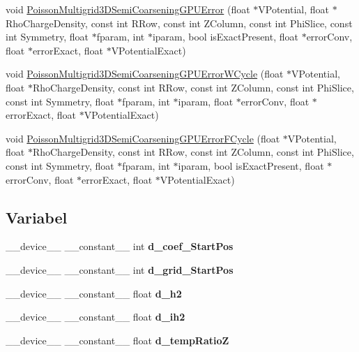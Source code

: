 \begin{DoxyCompactItemize}
\item 
void \hyperlink{PoissonSolver3DGPU_8cu_a06ab6e8b953038a4d4d4ea5e1ab646e8}{Poisson\+Multigrid3\+D\+Semi\+Coarsening\+G\+P\+U\+Error} (float $\ast$V\+Potential, float $\ast$Rho\+Charge\+Density, const int R\+Row, const int Z\+Column, const int Phi\+Slice, const int Symmetry, float $\ast$fparam, int $\ast$iparam, bool is\+Exact\+Present, float $\ast$error\+Conv, float $\ast$error\+Exact, float $\ast$V\+Potential\+Exact)
\item 
void \hyperlink{PoissonSolver3DGPU_8cu_a29ff8c657a945ecbeeb7b219169d09c6}{Poisson\+Multigrid3\+D\+Semi\+Coarsening\+G\+P\+U\+Error\+W\+Cycle} (float $\ast$V\+Potential, float $\ast$Rho\+Charge\+Density, const int R\+Row, const int Z\+Column, const int Phi\+Slice, const int Symmetry, float $\ast$fparam, int $\ast$iparam, float $\ast$error\+Conv, float $\ast$error\+Exact, float $\ast$V\+Potential\+Exact)
\item 
void \hyperlink{PoissonSolver3DGPU_8cu_a2a1da5844b8c399a35f446977c7ac550}{Poisson\+Multigrid3\+D\+Semi\+Coarsening\+G\+P\+U\+Error\+F\+Cycle} (float $\ast$V\+Potential, float $\ast$Rho\+Charge\+Density, const int R\+Row, const int Z\+Column, const int Phi\+Slice, const int Symmetry, float $\ast$fparam, int $\ast$iparam, bool is\+Exact\+Present, float $\ast$error\+Conv, float $\ast$error\+Exact, float $\ast$V\+Potential\+Exact)
\end{DoxyCompactItemize}
\subsection*{Variabel}
\begin{DoxyCompactItemize}
\item 
\hypertarget{PoissonSolver3DGPU_8cu_a1cbbf8dba207c28461994cbff905e3e1}{}\label{PoissonSolver3DGPU_8cu_a1cbbf8dba207c28461994cbff905e3e1} 
\+\_\+\+\_\+device\+\_\+\+\_\+ \+\_\+\+\_\+constant\+\_\+\+\_\+ int {\bfseries d\+\_\+coef\+\_\+\+Start\+Pos}
\item 
\hypertarget{PoissonSolver3DGPU_8cu_a779b816911e646fe3fa1319351101eeb}{}\label{PoissonSolver3DGPU_8cu_a779b816911e646fe3fa1319351101eeb} 
\+\_\+\+\_\+device\+\_\+\+\_\+ \+\_\+\+\_\+constant\+\_\+\+\_\+ int {\bfseries d\+\_\+grid\+\_\+\+Start\+Pos}
\item 
\hypertarget{PoissonSolver3DGPU_8cu_ad1269e072248aae5eb29b6d30b7b7ff5}{}\label{PoissonSolver3DGPU_8cu_ad1269e072248aae5eb29b6d30b7b7ff5} 
\+\_\+\+\_\+device\+\_\+\+\_\+ \+\_\+\+\_\+constant\+\_\+\+\_\+ float {\bfseries d\+\_\+h2}
\item 
\hypertarget{PoissonSolver3DGPU_8cu_abf21eece0795b48b20b73e225124303d}{}\label{PoissonSolver3DGPU_8cu_abf21eece0795b48b20b73e225124303d} 
\+\_\+\+\_\+device\+\_\+\+\_\+ \+\_\+\+\_\+constant\+\_\+\+\_\+ float {\bfseries d\+\_\+ih2}
\item 
\hypertarget{PoissonSolver3DGPU_8cu_a5cf69956b171a8c4ce44aba5ef46440e}{}\label{PoissonSolver3DGPU_8cu_a5cf69956b171a8c4ce44aba5ef46440e} 
\+\_\+\+\_\+device\+\_\+\+\_\+ \+\_\+\+\_\+constant\+\_\+\+\_\+ float {\bfseries d\+\_\+temp\+RatioZ}
\end{DoxyCompactItemize}


